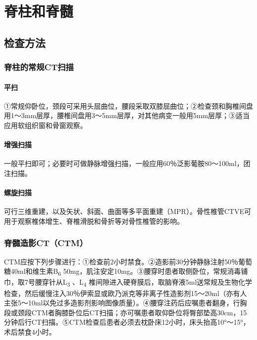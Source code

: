 \chapter{脊柱和脊髓}

\section{检查方法}

\subsection{脊柱的常规CT扫描}

\subsubsection{平扫}

①常规仰卧位，颈段可采用头屈曲位，腰段采取双膝屈曲位；②检查颈和胸椎间盘用1～3mm层厚，腰椎间盘用3～5mm层厚，对其他病变一般用5mm层厚；③适当应用软组织窗和骨窗观察。

\subsubsection{增强扫描}

一般平扫即可；必要时可做静脉增强扫描，一般应用60％泛影葡胺80～100ml，团注扫描。

\subsubsection{螺旋扫描}

可行三维重建，以及矢状、斜面、曲面等多平面重建（MPR）。骨性椎管CTVE可用于观察椎体增生、脊椎滑脱和骨折等对骨性椎管的影响。

\subsection{脊髓造影CT（CTM）}

CTM应按下列步骤进行：①检查前2小时禁食。②造影前30分钟静脉注射50％葡萄糖40ml和维生素B\textsubscript{6}
50mg，肌注安定10mg。③腰穿时患者取侧卧位，常规消毒铺巾，取7号腰穿针从L\textsubscript{3}
、L\textsubscript{4}
椎间隙进入硬脊膜后，取脑脊液5ml送常规及生物化学检查，然后缓慢注入30％伊索显或欧乃派克等非离子性造影剂15～20ml（亦有人主张5～10ml以免过多造影剂影响图像质量）。④腰穿注药后应嘱患者翻身，行胸段或颈段CTM者胸膝卧位后CT扫描；亦可嘱患者取仰卧位将臀部垫高30cm，15分钟后行CT扫描。⑤CTM检查后患者必须去枕卧床12小时，床头抬高10°～15°，术后禁食4小时。

